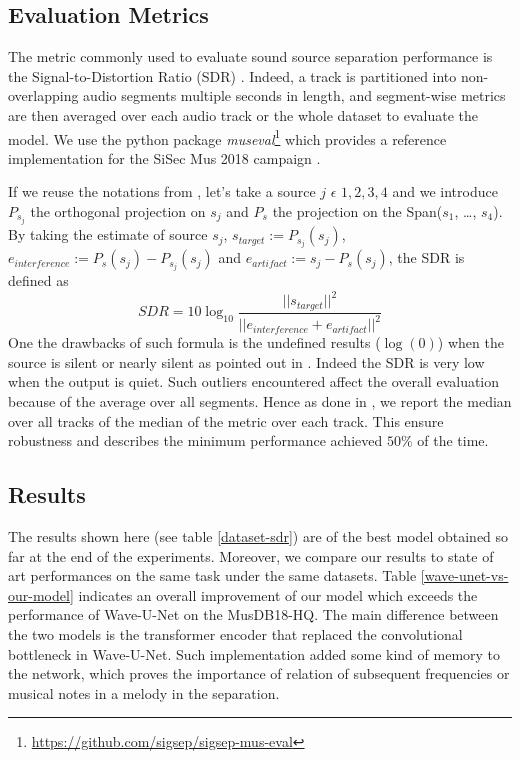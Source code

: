 \documentclass[final]{cvpr}
\begin{document}
\subsection{Evaluation Metrics}
The metric commonly used to evaluate sound source separation performance is the Signal-to-Distortion Ratio (SDR) \cite{sdr}. Indeed, a track is partitioned into non-overlapping audio segments multiple seconds in length, and segment-wise metrics are then averaged over each audio track or the whole dataset to evaluate the model. We use the python package \emph{museval}\footnote{\url{https://github.com/sigsep/sigsep-mus-eval}} which provides a reference implementation for the SiSec Mus 2018 campaign \cite{SiSec}.

If we reuse the notations from \cite{sdr}, let's take a source $j$ $\epsilon$ $1, 2, 3, 4$ and we introduce $P_{s_{j}}$ the orthogonal projection on $s_{j}$ and $P_{s}$ the projection on the Span($s_{1}$, \dots, $s_{4}$). By taking the estimate of source $s_{j}$, $s_{target}:=P_{s_j}(s_j)$, $e_{interference}:=P_s(s_j)-P_{s_j}(s_j)$ and $e_{artifact}:=s_j-P_s(s_j)$,
the SDR is defined as
\begin{equation}
   SDR = 10\log_{10} \frac{||s_{target}||^2}{||e_{interference}+e_{artifact}||^2}
\end{equation}
One the drawbacks of such formula is the undefined results ($\log(0)$) when the source is silent or nearly silent as pointed out in \cite{waveunet}. Indeed the SDR is very low when the output is quiet. Such outliers encountered affect the overall evaluation because of the average over all segments. Hence as done in \cite{SiSec}, we report the median over all tracks of the median of the metric over each track. This ensure robustness and describes the minimum performance achieved $50\%$ of the time.  
\subsection{Results}
The results shown here (see table \ref{dataset-sdr}) are of the best model obtained so far at the end of the experiments. Moreover, we compare our results to state of art performances on the same task under the same datasets.
Table \ref{wave-unet-vs-our-model} indicates an overall improvement of our model which exceeds the performance of Wave-U-Net on the MusDB18-HQ. The main difference between the two models is the transformer encoder that replaced the convolutional bottleneck in Wave-U-Net. Such implementation added some kind of memory to the network, which proves the importance of relation of subsequent frequencies or musical notes in a melody in the separation.
\end{document}
